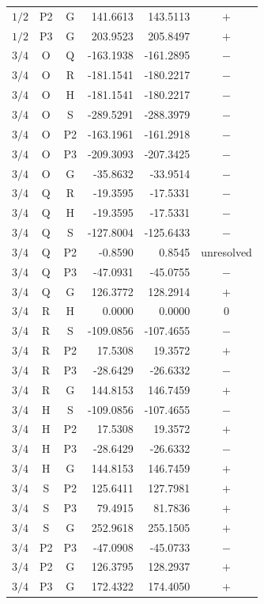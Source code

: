 \begin{longtable}{cccrrc}
$1/2$ & P2 & G & 141.6613 & 143.5113 & $+$ \\
$1/2$ & P3 & G & 203.9523 & 205.8497 & $+$ \\
$3/4$ & O & Q & -163.1938 & -161.2895 & $-$ \\
$3/4$ & O & R & -181.1541 & -180.2217 & $-$ \\
$3/4$ & O & H & -181.1541 & -180.2217 & $-$ \\
$3/4$ & O & S & -289.5291 & -288.3979 & $-$ \\
$3/4$ & O & P2 & -163.1961 & -161.2918 & $-$ \\
$3/4$ & O & P3 & -209.3093 & -207.3425 & $-$ \\
$3/4$ & O & G & -35.8632 & -33.9514 & $-$ \\
$3/4$ & Q & R & -19.3595 & -17.5331 & $-$ \\
$3/4$ & Q & H & -19.3595 & -17.5331 & $-$ \\
$3/4$ & Q & S & -127.8004 & -125.6433 & $-$ \\
$3/4$ & Q & P2 & -0.8590 & 0.8545 & unresolved \\
$3/4$ & Q & P3 & -47.0931 & -45.0755 & $-$ \\
$3/4$ & Q & G & 126.3772 & 128.2914 & $+$ \\
$3/4$ & R & H & 0.0000 & 0.0000 & $0$ \\
$3/4$ & R & S & -109.0856 & -107.4655 & $-$ \\
$3/4$ & R & P2 & 17.5308 & 19.3572 & $+$ \\
$3/4$ & R & P3 & -28.6429 & -26.6332 & $-$ \\
$3/4$ & R & G & 144.8153 & 146.7459 & $+$ \\
$3/4$ & H & S & -109.0856 & -107.4655 & $-$ \\
$3/4$ & H & P2 & 17.5308 & 19.3572 & $+$ \\
$3/4$ & H & P3 & -28.6429 & -26.6332 & $-$ \\
$3/4$ & H & G & 144.8153 & 146.7459 & $+$ \\
$3/4$ & S & P2 & 125.6411 & 127.7981 & $+$ \\
$3/4$ & S & P3 & 79.4915 & 81.7836 & $+$ \\
$3/4$ & S & G & 252.9618 & 255.1505 & $+$ \\
$3/4$ & P2 & P3 & -47.0908 & -45.0733 & $-$ \\
$3/4$ & P2 & G & 126.3795 & 128.2937 & $+$ \\
$3/4$ & P3 & G & 172.4322 & 174.4050 & $+$ \\
\hline\end{longtable}\normalsize
